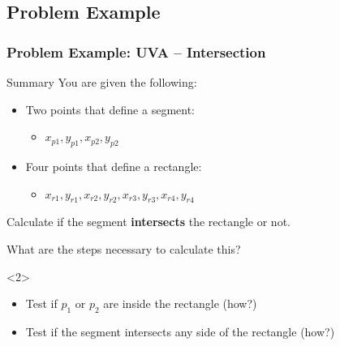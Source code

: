 \documentclass{beamer}
\begin{document}
\subsection{Problem Example}
\begin{frame}
  \frametitle{Problem Example: UVA -- Intersection}
  {\small
    \begin{block}{Summary}
      You are given the following:
      \begin{itemize}
      \item Two points that define a segment:
        \begin{itemize}
        \item $x_{p1}, y_{p1}, x_{p2}, y_{p2}$
        \end{itemize}
      \item Four points that define a rectangle:
        \begin{itemize}
        \item $x_{r1}, y_{r1}, x_{r2}, y_{r2}, x_{r3}, y_{r3}, x_{r4}, y_{r4}$
        \end{itemize}
      \end{itemize}
      
      Calculate if the segment {\bf intersects} the rectangle or not.
    \end{block}

    \bigskip
    
    What are the steps necessary to calculate this?
    
    \begin{onlyenv}<2>
      \begin{itemize}
      \item Test if $p_1$ or $p_2$ are inside the rectangle (how?)
      \item Test if the segment intersects any side of the rectangle (how?)
      \end{itemize}
    \end{onlyenv}
  }
\end{frame}
\end{document}
